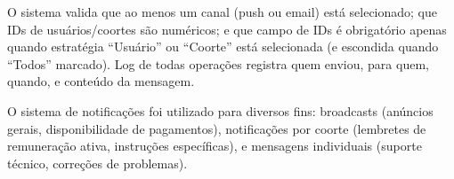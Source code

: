 O sistema valida que ao menos um canal (push ou email) está selecionado; que IDs de usuários/coortes são numéricos; e que campo de IDs é obrigatório apenas quando estratégia ``Usuário'' ou ``Coorte'' está selecionada (e escondida quando ``Todos'' marcado). Log de todas operações registra quem enviou, para quem, quando, e conteúdo da mensagem.

O sistema de notificações foi utilizado para diversos fins: broadcasts (anúncios gerais, disponibilidade de pagamentos), notificações por coorte (lembretes de remuneração ativa, instruções específicas), e mensagens individuais (suporte técnico, correções de problemas).


